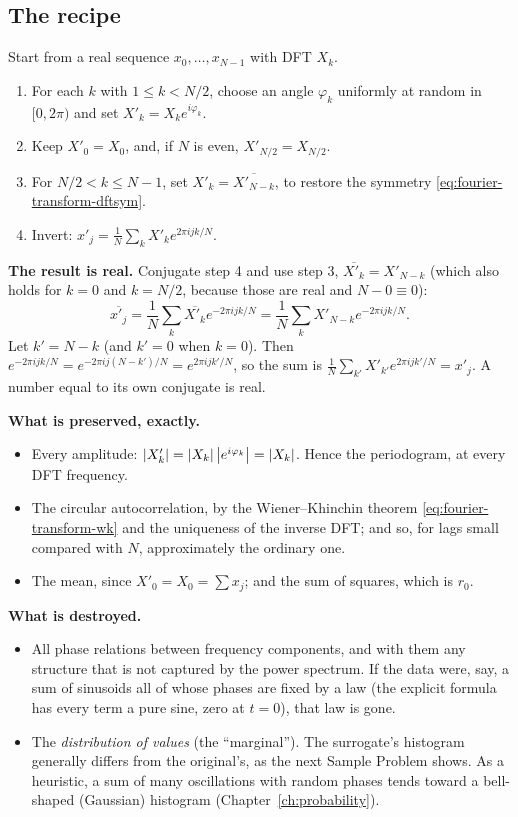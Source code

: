 \subsection{The recipe}

Start from a real sequence $x_0,\dots,x_{N-1}$ with DFT $X_k$.
\begin{enumerate}
\item For each $k$ with $1\le k<N/2$, choose an angle $\varphi_k$ uniformly at random in $[0,2\pi)$ and set $X'_k=X_ke^{i\varphi_k}$.
\item Keep $X'_0=X_0$, and, if $N$ is even, $X'_{N/2}=X_{N/2}$.
\item For $N/2<k\le N-1$, set $X'_k=\overline{X'_{N-k}}$, to restore the symmetry \eqref{eq:fourier-transform-dftsym}.
\item Invert: $x'_j=\frac1N\sum_kX'_ke^{2\pi ijk/N}$.
\end{enumerate}

\textbf{The result is real.} Conjugate step 4 and use step 3, $\overline{X'_k}=X'_{N-k}$ (which also holds for $k=0$ and $k=N/2$, because those are real and $N-0\equiv0$):
\[\overline{x'_j}=\frac1N\sum_k\overline{X'_k}e^{-2\pi ijk/N}=\frac1N\sum_kX'_{N-k}e^{-2\pi ijk/N}.\]
Let $k'=N-k$ (and $k'=0$ when $k=0$). Then $e^{-2\pi ijk/N}=e^{-2\pi ij(N-k')/N}=e^{2\pi ijk'/N}$, so the sum is $\frac1N\sum_{k'}X'_{k'}e^{2\pi ijk'/N}=x'_j$. A number equal to its own conjugate is real.

\textbf{What is preserved, exactly.}
\begin{itemize}
\item Every amplitude: $\left\lvert X'_k\right\rvert=\left\lvert X_k\right\rvert\left\lvert e^{i\varphi_k}\right\rvert=\left\lvert X_k\right\rvert$. Hence the periodogram, at every DFT frequency.
\item The circular autocorrelation, by the Wiener--Khinchin theorem \eqref{eq:fourier-transform-wk} and the uniqueness of the inverse DFT; and so, for lags small compared with $N$, approximately the ordinary one.
\item The mean, since $X'_0=X_0=\sum x_j$; and the sum of squares, which is $r_0$.
\end{itemize}

\textbf{What is destroyed.}
\begin{itemize}
\item All phase relations between frequency components, and with them any structure that is not captured by the power spectrum. If the data were, say, a sum of sinusoids all of whose phases are fixed by a law (the explicit formula has every term a pure sine, zero at $t=0$), that law is gone.
\item The \emph{distribution of values} (the ``marginal''). The surrogate's histogram generally differs from the original's, as the next Sample Problem shows. As a heuristic, a sum of many oscillations with random phases tends toward a bell-shaped (Gaussian) histogram (Chapter~\ref{ch:probability}).
\end{itemize}

